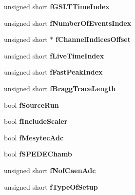 \begin{DoxyCompactItemize}
unsigned short {\bfseries f\+G\+S\+L\+T\+Time\+Index}
\item 
\mbox{\label{class_global_settings_a0a695f74fb8fb13a7212c03cc1c90d45}} 
unsigned short {\bfseries f\+Number\+Of\+Events\+Index}
\item 
\mbox{\label{class_global_settings_a7b7fde75713d340b0c08b69cf52629b5}} 
unsigned short $\ast$ {\bfseries f\+Channel\+Indices\+Offset}
\item 
\mbox{\label{class_global_settings_af6b5925fc6dc199bd0859a1d4471f4fb}} 
unsigned short {\bfseries f\+Live\+Time\+Index}
\item 
\mbox{\label{class_global_settings_a909c95bed26cb1703234e1d7bbee812e}} 
unsigned short {\bfseries f\+Fast\+Peak\+Index}
\item 
\mbox{\label{class_global_settings_ad6552c5816c5265d32f930c96cb05897}} 
unsigned short {\bfseries f\+Bragg\+Trace\+Length}
\item 
\mbox{\label{class_global_settings_ab91214dfb8843edede96c9a0a6b43af4}} 
bool {\bfseries f\+Source\+Run}
\item 
\mbox{\label{class_global_settings_a8f72ba223b743b631ef8a5d5326e2cc1}} 
bool {\bfseries f\+Include\+Scaler}
\item 
\mbox{\label{class_global_settings_a07a745de62188ac45111e5a0a53ee2a5}} 
bool {\bfseries f\+Mesytec\+Adc}
\item 
\mbox{\label{class_global_settings_a24efecbf225ff6579002125d0717581d}} 
bool {\bfseries f\+S\+P\+E\+D\+E\+Chamb}
\item 
\mbox{\label{class_global_settings_a3a834ca5fe537c8ee1a6eaee52fedf24}} 
unsigned short {\bfseries f\+Nof\+Caen\+Adc}
\item 
\mbox{\label{class_global_settings_a7cfa68e7cba82725e43b12bcf85795fa}} 
unsigned short {\bfseries f\+Type\+Of\+Setup}

\end{DoxyCompactItemize}
